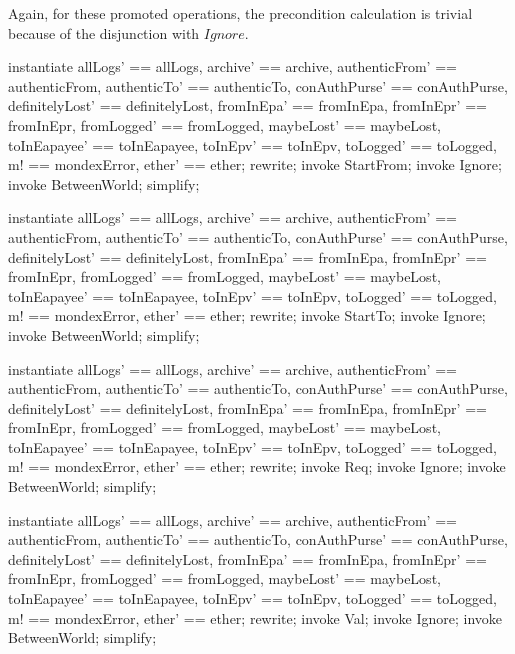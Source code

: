 Again, for these promoted operations, the precondition calculation
is trivial because of the disjunction with $Ignore$.
%
\begin{LPScript}\begin{zproof}[tBetwStartFromIsTotal]
   instantiate
      allLogs' == allLogs, archive' == archive,
      authenticFrom' == authenticFrom, authenticTo' == authenticTo,
      conAuthPurse' == conAuthPurse, definitelyLost' == definitelyLost,
      fromInEpa' == fromInEpa, fromInEpr' == fromInEpr,
      fromLogged' == fromLogged, maybeLost' == maybeLost,
      toInEapayee' == toInEapayee, toInEpv' == toInEpv,
      toLogged' == toLogged, m! == mondexError, ether' == ether;
    rewrite;
    invoke StartFrom;
    invoke Ignore;
    invoke \Xi BetweenWorld;
    simplify;
\end{zproof}\end{LPScript}

\begin{LPScript}\begin{zproof}[tBetwStartToIsTotal]
   instantiate
      allLogs' == allLogs, archive' == archive,
      authenticFrom' == authenticFrom, authenticTo' == authenticTo,
      conAuthPurse' == conAuthPurse, definitelyLost' == definitelyLost,
      fromInEpa' == fromInEpa, fromInEpr' == fromInEpr,
      fromLogged' == fromLogged, maybeLost' == maybeLost,
      toInEapayee' == toInEapayee, toInEpv' == toInEpv,
      toLogged' == toLogged, m! == mondexError, ether' == ether;
    rewrite;
    invoke StartTo;
    invoke Ignore;
    invoke \Xi BetweenWorld;
    simplify;
\end{zproof}\end{LPScript}

\begin{LPScript}\begin{zproof}[tBetwReqIsTotal]
   instantiate
      allLogs' == allLogs, archive' == archive,
      authenticFrom' == authenticFrom, authenticTo' == authenticTo,
      conAuthPurse' == conAuthPurse, definitelyLost' == definitelyLost,
      fromInEpa' == fromInEpa, fromInEpr' == fromInEpr,
      fromLogged' == fromLogged, maybeLost' == maybeLost,
      toInEapayee' == toInEapayee, toInEpv' == toInEpv,
      toLogged' == toLogged, m! == mondexError, ether' == ether;
    rewrite;
    invoke Req;
    invoke Ignore;
    invoke \Xi BetweenWorld;
    simplify;
\end{zproof}\end{LPScript}

\begin{LPScript}\begin{zproof}[tBetwValIsTotal]
   instantiate
      allLogs' == allLogs, archive' == archive,
      authenticFrom' == authenticFrom, authenticTo' == authenticTo,
      conAuthPurse' == conAuthPurse, definitelyLost' == definitelyLost,
      fromInEpa' == fromInEpa, fromInEpr' == fromInEpr,
      fromLogged' == fromLogged, maybeLost' == maybeLost,
      toInEapayee' == toInEapayee, toInEpv' == toInEpv,
      toLogged' == toLogged, m! == mondexError, ether' == ether;
    rewrite;
    invoke Val;
    invoke Ignore;
    invoke \Xi BetweenWorld;
    simplify;
\end{zproof}\end{LPScript}

